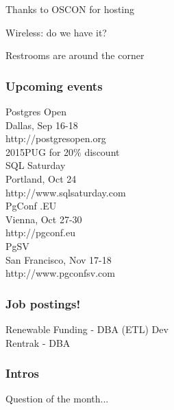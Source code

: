 \documentclass{beamer}
\begin{document}

\frame
{
  \begin{center}
  \item[]Thanks to OSCON for hosting
  \item[]Wireless: do we have it?
  \item[]Restrooms are around the corner
  \end{center}
}

\frame
{
  \frametitle{Upcoming events}
  \begin{center}
{\large Postgres Open\\}
Dallas, Sep 16-18\\
http://postgresopen.org\\
{\tiny 2015PUG for 20\% discount}\\
\vspace{5 mm}
{\large SQL Saturday\\}
Portland, Oct 24\\
http://www.sqlsaturday.com\\
\vspace{5 mm}
{\large PgConf
.EU\\}
Vienna, Oct 27-30\\
http://pgconf.eu\\
\vspace{5 mm}
{\large PgSV\\}
San Francisco, Nov 17-18\\
http://www.pgconfsv.com\\
  \end{center}
}

\frame
{
  \frametitle{Job postings!}
  \begin{center}
Renewable Funding - DBA (ETL) Dev\\
\vspace{5 mm}
Rentrak - DBA\\
\vspace{5 mm}
  \end{center}
}

\frame
{
  \frametitle{Intros}
  \begin{center}
Question of the month...\\
  \end{center}
}
\end{document}
